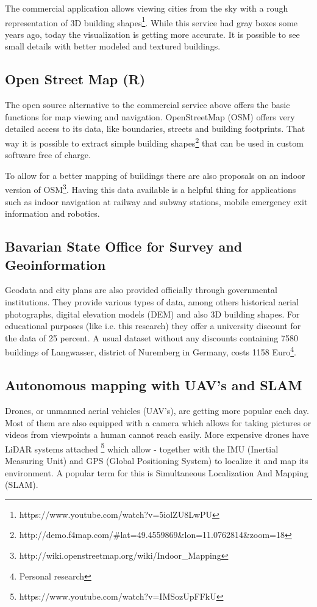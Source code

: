 The commercial application allows viewing cities from the sky with a rough representation of 3D building shapes\footnote{https://www.youtube.com/watch?v=5iolZU8LwPU}. While this service had gray boxes some years ago, today the visualization is getting more accurate. It is possible to see small details with better modeled and textured buildings.

\subsection{Open Street Map (R) }

The open source alternative to the commercial service above offers the basic functions for map viewing and navigation. OpenStreetMap (OSM) offers very detailed access to its data, like boundaries, streets and building footprints. That way it is possible to extract simple building shapes\footnote{http://demo.f4map.com/\#lat=49.4559869\&lon=11.0762814\&zoom=18} that can be used in custom software free of charge.

To allow for a better mapping of buildings there are also proposals on an indoor version of OSM\footnote{http://wiki.openstreetmap.org/wiki/Indoor\_Mapping}. Having this data available is a helpful thing for applications such as indoor navigation at railway and subway stations, mobile emergency exit information and robotics.

\subsection{Bavarian State Office for Survey and Geoinformation}

Geodata and city plans are also provided officially through governmental institutions. They provide various types of data, among others historical aerial photographs, digital elevation models (DEM) and also 3D building shapes. For educational purposes (like i.e. this research) they offer a university discount for the data of 25 percent. A usual dataset without any discounts containing 7580 buildings of Langwasser, district of Nuremberg in Germany, costs 1158 Euro\footnote{Personal research}.

\subsection{Autonomous mapping with UAV's and SLAM}

Drones, or unmanned aerial vehicles (UAV's), are getting more popular each day. Most of them are also equipped with a camera which allows for taking pictures or videos from viewpoints a human cannot reach easily. More expensive drones have LiDAR systems attached \footnote{https://www.youtube.com/watch?v=IMSozUpFFkU} which allow - together with the IMU (Inertial Measuring Unit) and GPS (Global Positioning System) to localize it and map its environment. A popular term for this is Simultaneous Localization And Mapping (SLAM).

